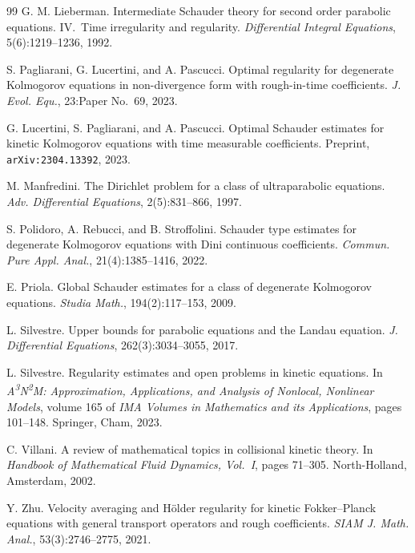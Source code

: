 \documentclass[11pt,reqno]{amsart}
\numberwithin{equation}{section}
\theoremstyle{remark}
\begin{document}
\begin{thebibliography}{99}
G. M. Lieberman.
\newblock Intermediate Schauder theory for second order parabolic equations. IV.\ Time irregularity and regularity.
\newblock \emph{Differential Integral Equations}, 5(6):1219--1236, 1992.

S. Pagliarani, G. Lucertini, and A. Pascucci.
\newblock Optimal regularity for degenerate Kolmogorov equations in
non-divergence form with rough-in-time coefficients.
\newblock \emph{J. Evol. Equ.}, 23:Paper No.~69, 2023.

G. Lucertini, S. Pagliarani, and A. Pascucci.
\newblock Optimal Schauder estimates for kinetic Kolmogorov equations with time measurable coefficients.
\newblock Preprint, \texttt{arXiv:2304.13392}, 2023.

M. Manfredini.
\newblock The Dirichlet problem for a class of ultraparabolic equations.
\newblock \emph{Adv. Differential Equations}, 2(5):831--866, 1997.

S. Polidoro, A. Rebucci, and B. Stroffolini.
\newblock Schauder type estimates for degenerate Kolmogorov equations with Dini continuous coefficients.
\newblock \emph{Commun. Pure Appl. Anal.}, 21(4):1385--1416, 2022.

E. Priola.
\newblock Global Schauder estimates for a class of degenerate Kolmogorov equations.
\newblock \emph{Studia Math.}, 194(2):117--153, 2009.

L. Silvestre.
\newblock Upper bounds for parabolic equations and the Landau equation.
\newblock \emph{J. Differential Equations}, 262(3):3034--3055, 2017.

L. Silvestre.
\newblock Regularity estimates and open problems in kinetic equations.
\newblock In \emph{A\textsuperscript{3}N\textsuperscript{2}M:
Approximation, Applications, and Analysis of Nonlocal, Nonlinear Models},
volume 165 of \emph{IMA Volumes in Mathematics and its Applications},
pages 101--148. Springer, Cham, 2023.

C. Villani.
\newblock A review of mathematical topics in collisional kinetic theory.
\newblock In \emph{Handbook of Mathematical Fluid Dynamics, Vol.~I}, pages 71--305. North-Holland, Amsterdam, 2002.

Y. Zhu.
\newblock Velocity averaging and H\"older regularity for kinetic Fokker--Planck equations with general transport operators and rough coefficients.
\newblock \emph{SIAM J. Math. Anal.}, 53(3):2746--2775, 2021.

\end{thebibliography}
\end{document}

